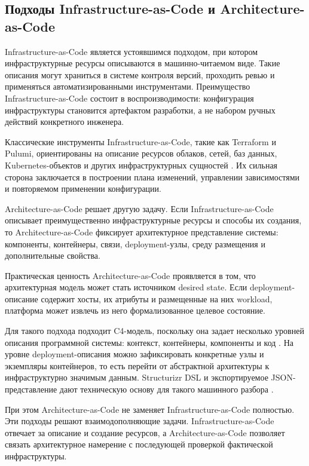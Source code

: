 \subsection{Подходы Infrastructure-as-Code и Architecture-as-Code}

Infrastructure-as-Code является устоявшимся подходом, при котором инфраструктурные ресурсы описываются в машинно-читаемом виде. Такие описания могут храниться в системе контроля версий, проходить ревью и применяться автоматизированными инструментами. Преимущество Infrastructure-as-Code состоит в воспроизводимости: конфигурация инфраструктуры становится артефактом разработки, а не набором ручных действий конкретного инженера.

Классические инструменты Infrastructure-as-Code, такие как Terraform и Pulumi, ориентированы на описание ресурсов облаков, сетей, баз данных, Kubernetes-объектов и других инфраструктурных сущностей \cite{terraform_docs,pulumi_iac}. Их сильная сторона заключается в построении плана изменений, управлении зависимостями и повторяемом применении конфигурации.

Architecture-as-Code решает другую задачу. Если Infrastructure-as-Code описывает преимущественно инфраструктурные ресурсы и способы их создания, то Architecture-as-Code фиксирует архитектурное представление системы: компоненты, контейнеры, связи, deployment-узлы, среду размещения и дополнительные свойства.

Практическая ценность Architecture-as-Code проявляется в том, что архитектурная модель может стать источником desired state. Если deployment-описание содержит хосты, их атрибуты и размещенные на них workload, платформа может извлечь из него формализованное целевое состояние.

Для такого подхода подходит C4-модель, поскольку она задает несколько уровней описания программной системы: контекст, контейнеры, компоненты и код \cite{c4_model}. На уровне deployment-описания можно зафиксировать конкретные узлы и экземпляры контейнеров, то есть перейти от абстрактной архитектуры к инфраструктурно значимым данным. Structurizr DSL и экспортируемое JSON-представление дают техническую основу для такого машинного разбора \cite{structurizr_dsl}.

При этом Architecture-as-Code не заменяет Infrastructure-as-Code полностью. Эти подходы решают взаимодополняющие задачи. Infrastructure-as-Code отвечает за описание и создание ресурсов, а Architecture-as-Code позволяет связать архитектурное намерение с последующей проверкой фактической инфраструктуры.

